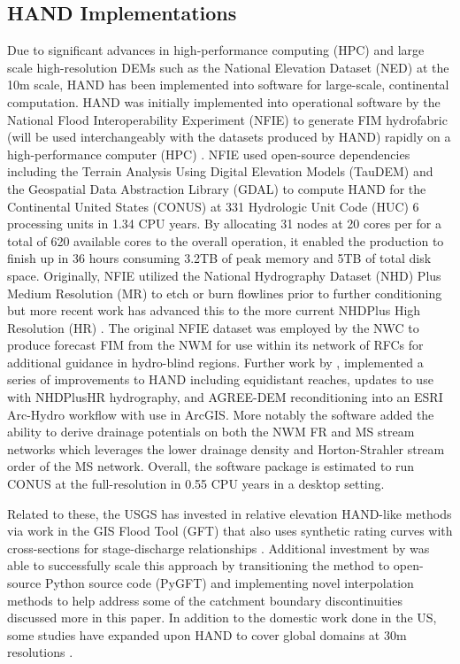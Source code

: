 \subsection{HAND Implementations}
%
Due to significant advances in high-performance computing (HPC) and large scale high-resolution DEMs such as the National Elevation Dataset (NED) at the 10m scale, HAND has been implemented into software for large-scale, continental computation. 
HAND was initially implemented into operational software by the National Flood Interoperability Experiment (NFIE) to generate FIM hydrofabric (will be used interchangeably with the datasets produced by HAND) rapidly on a high-performance computer (HPC) \cite{maidment2017conceptual,liu2016cybergis}. 
NFIE used open-source dependencies including the Terrain Analysis Using Digital Elevation Models (TauDEM) \cite{tarboton2005terrain} and the Geospatial Data Abstraction Library (GDAL) \cite{warmerdam2008geospatial} to compute HAND for the Continental United States (CONUS) at 331 Hydrologic Unit Code (HUC) 6 processing units in 1.34 CPU years.
By allocating 31 nodes at 20 cores per for a total of 620 available cores to the overall operation, it enabled the production to finish up in 36 hours consuming 3.2TB of peak memory and 5TB of total disk space.
Originally, NFIE utilized the National Hydrography Dataset (NHD) Plus Medium Resolution (MR) to etch or burn flowlines prior to further conditioning but more recent work has advanced this to the more current NHDPlus High Resolution (HR) \cite{liu2020height}. 
The original NFIE dataset was employed by the NWC to produce forecast FIM from the NWM for use within its network of RFCs for additional guidance in hydro-blind regions.
Further work by , implemented a series of improvements to HAND including equidistant reaches, updates to use with NHDPlusHR hydrography, and AGREE-DEM reconditioning \cite{hellweger1997agree} into an ESRI Arc-Hydro workflow with use in ArcGIS. 
More notably the software added the ability to derive drainage potentials on both the NWM FR and MS stream networks which leverages the lower drainage density and Horton-Strahler stream order of the MS network.
Overall, the software package is estimated to run CONUS at the full-resolution in 0.55 CPU years in a desktop setting.

Related to these, the USGS has invested in relative elevation HAND-like methods via work in the GIS Flood Tool (GFT) that also uses synthetic rating curves with cross-sections for stage-discharge relationships \cite{verdin2016software}.
Additional investment by  was able to successfully scale this approach by transitioning the method to open-source Python source code (PyGFT) and implementing novel interpolation methods to help address some of the catchment boundary discontinuities discussed more in this paper.
In addition to the domestic work done in the US, some studies have expanded upon HAND to cover global domains at 30m resolutions \cite{yamazaki2019merit,donchyts2016global}.
%
